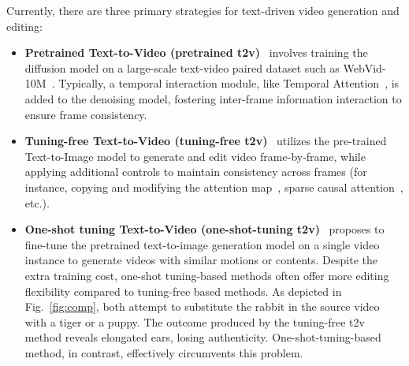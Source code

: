 \documentclass{article}
\begin{document}
Currently, there are three primary strategies for text-driven video generation and editing:
\begin{itemize}
    \itemsep0em 
    \item \textbf{Pretrained Text-to-Video (pretrained t2v)}~\cite{van2017neural,wu2022nuwa,hong2022cogvideo} involves training the diffusion model on a large-scale text-video paired dataset such as WebVid-10M~\cite{bain2021frozen}. Typically, a temporal interaction module, like Temporal Attention~\cite{ho2022video}, is added to the denoising model, fostering inter-frame information interaction to ensure frame consistency.
    \item \textbf{Tuning-free Text-to-Video (tuning-free t2v)}~\cite{qi2023fatezero,liu2023video,ceylan2023pix2video} utilizes the pre-trained Text-to-Image model to generate and edit video frame-by-frame, while applying additional controls to maintain consistency across frames (for instance, copying and modifying the attention map~\cite{hertz2022prompt,qi2023fatezero,liu2023video}, sparse causal attention~\cite{wu2022tune}, etc.).
    \item \textbf{One-shot tuning Text-to-Video (one-shot-tuning t2v)}~\cite{wu2022tune,nikankin2022sinfusion} proposes to fine-tune the pretrained text-to-image generation model on a single video instance to generate videos with similar motions or contents. Despite the extra training cost, one-shot tuning-based methods often offer more editing flexibility compared to tuning-free based methods. As depicted in Fig.~\ref{fig:comp}, both attempt to substitute the rabbit in the source video with a tiger or a puppy. The outcome produced by the tuning-free t2v method reveals elongated ears, losing authenticity. One-shot-tuning-based method, in contrast, effectively circumvents this problem.
\end{itemize}
\end{document}
